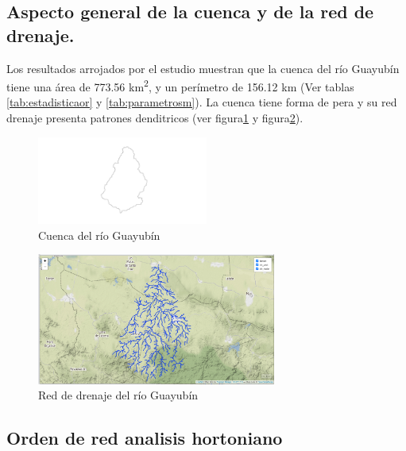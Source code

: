 \documentclass[11pt,]{article}
\begin{document}
\subsection{Aspecto general de la cuenca y de la red de
drenaje.}\label{aspecto-general-de-la-cuenca-y-de-la-red-de-drenaje.}

Los resultados arrojados por el estudio muestran que la cuenca del río
Guayubín tiene una área de 773.56 km\textsuperscript{2}, y un perímetro
de 156.12 km (Ver tablas \ref{tab:estadisticaor} y
\ref{tab:parametrosm}). La cuenca tiene forma de pera y su red drenaje
presenta patrones denditricos (ver figura\ref{cuencavectorial} y
figura\ref{red de drenaje extraida}).

\begin{figure}
\centering
\includegraphics[width=0.50000\textwidth]{cuenca extraida.png}
\caption{Cuenca del río Guayubín\label{cuencavectorial}}
\end{figure}

\begin{figure}
\centering
\includegraphics[width=0.70000\textwidth]{red de drenaje extraida.png}
\caption{Red de drenaje del río Guayubín\label{red de drenaje extraida}}
\end{figure}

\subsection{Orden de red analisis
hortoniano}\label{orden-de-red-analisis-hortoniano}
\end{document}
